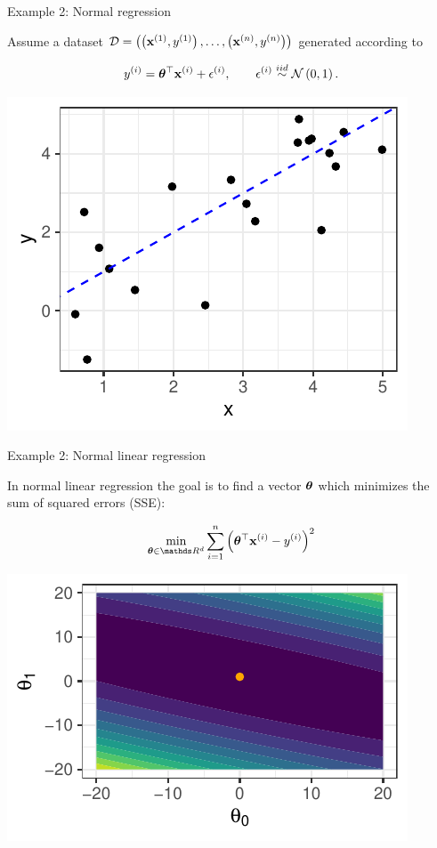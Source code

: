 \begin{vbframe}{Example 2: Normal regression}

Assume a dataset $\mathcal{D} = \left( \left(\mathbf{x}^{(1)}, y^{(1)}\right), \ldots, \left(\mathbf{x}^{(n)}, y^{(n)}\right)\right)$ generated according to

$$
y^{(i)} = \bm{\theta}^\top \mathbf{x}^{(i)} + \epsilon^{(i)}, \qquad \epsilon^{(i)} \overset{iid}{\sim} \mathcal{N}\left(0, 1\right).
$$

\begin{center}
	\includegraphics[height=0.4\textwidth, keepaspectratio]{figure_man/ml_linreg_example_1.pdf} 
\end{center}

\end{vbframe}

\begin{vbframe}{Example 2: Normal linear regression} 


In normal linear regression the goal is to find a vector $\bm{\theta}$ which minimizes the sum of squared errors (SSE): 

$$
\min_{\thetab \in \R^d} \sum_{i = 1}^n \left(\thetab^\top \xi - \yi\right)^2
$$

\begin{center}
	\includegraphics[height=0.30\textwidth, keepaspectratio]{figure_man/ml_linreg_example_2.pdf}
\end{center}

\end{vbframe}

